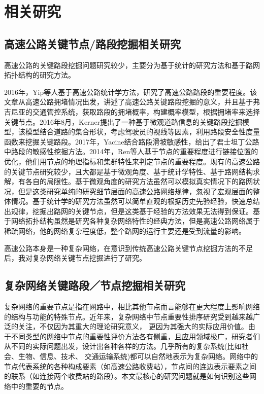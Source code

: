 
\chapter{相关研究}

\section{高速公路关键节点/路段挖掘相关研究}
	高速公路的关键路段挖掘问题研究较少，主要分为基于统计的研究方法和基于路网拓扑结构的研究方法。

	2016年，Yip等人基于高速公路统计学方法\parencite{YipTongji}，研究了高速公路路段的重要程度。该文章从高速公路拥堵情况出发，讲述了高速公路关键路段挖掘的意义，并且基于弗吉尼亚的交通管控系统，获取路段的拥堵概率，构建概率模型，根据拥堵率来选择关键节点。2016年8月，Kerner提出了一种基于微观道路信息的关键路段挖掘模型\parencite{Kerner2015The}，该模型结合道路的集合形状，考虑驾驶员的视线等因素，利用路段安全性度量函数来挖掘关键路段。2017年，Yacine结合路段滑坡敏感性，给出了君士坦丁公路中路段的敏感性挖掘方法\parencite{Yacine2017Landslide}。2014年，Ren等人基于节点的重要程度进行链接位置的优化，他们用节点的地理指标和集群特性来判定节点的重要程度。现有的高速公路的关键节点研究较少，且大都是基于微观角度、基于统计学特性、基于路网结构求解，有各自的局限性。基于微观角度的研究方法虽然可以模拟真实情况下的路网状况，但是这类研究单纯的研究细节层面的高速公路网络规律，忽视了宏观层面的整体情况。基于统计学的研究方法虽然可以简单直观的根据历史先验经验，快速总结出规律，挖掘出路网的关键节点，但是这类基于经验的方法效果无法得到保证。基于网络拓扑结构虽然是研究各种复杂网络特性的经典方法，但是高速公路网络属于稀疏网络，他的网络复杂程度低，整个路网的运行主要还是受到流量的影响。

	高速公路本身是一种复杂网络，在意识到传统高速公路关键节点挖掘方法的不足后，我对复杂网络关键节点挖掘进行了研究。

\section{复杂网络关键路段／节点挖掘相关研究}
	复杂网络的重要节点是指在网路中，相比其他节点而言能够在更大程度上影响网络的结构与功能的特殊节点。近年来，复杂网络中节点重要性排序研究受到越来越广泛的关注，不仅因为其重大的理论研究意义， 更因为其强大的实际应用价值。由于不同类型的网络中节点的重要性评价方法各有侧重，且应用领域极广，研究者们从不同的实际问题出发，设计出各种各样的方法。几乎所有的复杂系统(比如社会、生物、信息、技术、 交通运输系统)都可以自然地表示为复杂网络。网络中的节点代表系统的各种构成要素（如高速公路收费站），节点间的连边表示要素之间的联系（如连接两个收费站的路段）。本文最核心的研究问题就是如何识别这些网络中的重要的节点。 

